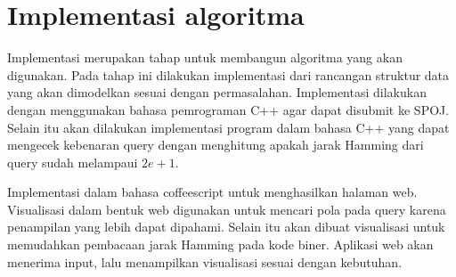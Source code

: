 \section{Implementasi algoritma}

Implementasi merupakan tahap untuk membangun algoritma yang akan digunakan. Pada tahap ini dilakukan implementasi dari rancangan struktur data yang akan dimodelkan sesuai dengan permasalahan. Implementasi dilakukan dengan menggunakan bahasa pemrograman C++ agar dapat disubmit ke SPOJ. Selain itu akan dilakukan implementasi program dalam bahasa C++ yang dapat mengecek kebenaran query dengan menghitung apakah jarak Hamming dari query sudah melampaui $2e+1$.

Implementasi dalam bahasa coffeescript untuk menghasilkan halaman web. Visualisasi dalam bentuk web digunakan untuk mencari pola pada query karena penampilan yang lebih dapat dipahami. Selain itu akan dibuat visualisasi untuk memudahkan pembacaan jarak Hamming pada kode biner. Aplikasi web akan menerima input, lalu menampilkan visualisasi sesuai dengan kebutuhan.
